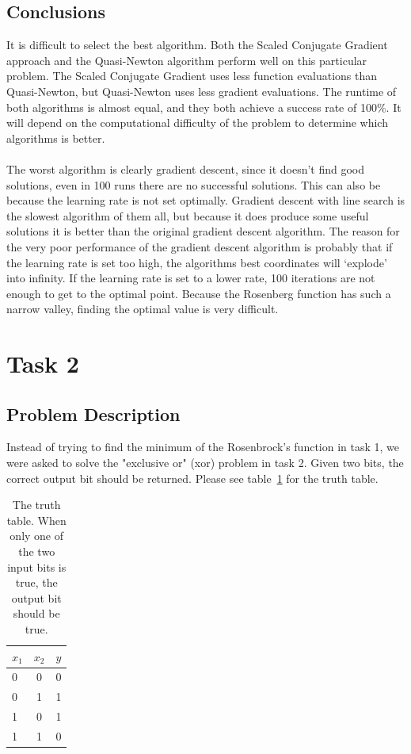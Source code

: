 \documentclass{article}
\begin{document}
\subsection{Conclusions}
It is difficult to select the best algorithm. Both the Scaled Conjugate Gradient approach and the Quasi-Newton algorithm perform well on this particular problem. The Scaled Conjugate Gradient uses less function evaluations than Quasi-Newton, but Quasi-Newton uses less gradient evaluations. The runtime of both algorithms is almost equal, and they both achieve a success rate of 100\%. It will depend on the computational difficulty of the problem to determine which algorithms is better. \\\\
The worst algorithm is clearly gradient descent, since it doesn't find good solutions, even in 100 runs there are no successful solutions. This can also be because the learning rate is not set optimally. Gradient descent with line search is the slowest algorithm of them all, but because it does produce some useful solutions it is better than the original gradient descent algorithm.
The reason for the very poor performance of the gradient descent algorithm is probably that if the learning rate is set too high, the algorithms best coordinates will `explode' into infinity. If the learning rate is set to a lower rate, 100 iterations are not enough to get to the optimal point. Because the Rosenberg function has such a narrow valley, finding the optimal value is very difficult.

\newpage
\section{Task 2}
\subsection{Problem Description}
Instead of trying to find the minimum of the Rosenbrock's function in task 1, we were asked to solve the "exclusive or" (xor) problem in task 2. Given two bits, the correct output bit should be returned. Please see table~\ref{tab:tt} for the truth table.

\begin{table}[H]
	\centering
	\begin{tabular}{| l | c | r |}
		\hline
		$x_1$ & $x_2$ & $y$ \\ \hline
		0 & 0 & 0 \\ \hline
		0 & 1 & 1 \\ \hline
		1 & 0 & 1 \\ \hline
		1 & 1 & 0 \\ \hline
	\end{tabular}
	\caption{The truth table. When only one of the two input bits is true, the output bit should be true.}
	\label{tab:tt}
\end{table}
\end{document}
